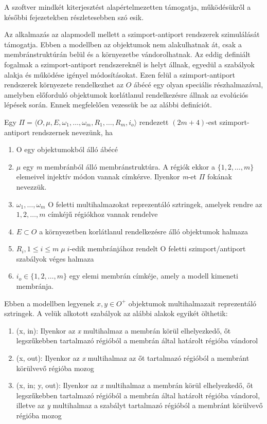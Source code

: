 A szoftver mindkét kiterjesztést alapértelmezetten támogatja, működésükről a későbbi fejezetekben részletesebben szó esik.

Az alkalmazás az alapmodell mellett a szimport-antiport rendszerek szimulálását támogatja. 
Ebben a modellben az objektumok nem alakulhatnak át, csak a membránstruktúrán belül és a környezetbe vándorolhatnak. Az eddig definiált fogalmak a szimport-antiport rendszereknél is helyt állnak, egyedül a szabályok alakja és működése igényel módosításokat. 
Ezen felül a szimport-antiport rendszerek környezete rendelkezhet az $O$ ábécé egy olyan speciális részhalmazával, amelyben előforduló objektumok korlátlanul rendelkezésre állnak az evolúciós lépések során.
Ennek megfelelően vezessük be az alábbi definíciót.

\begin{definition}
Egy $\Pi = \langle O, \mu , E, \omega_1 , \dots , \omega_m, R_1 , \dots , R_m , i_o  \rangle$ rendezett $(2m + 4)$-est szimport-antiport rendszernek nevezünk, ha

\begin{enumerate}
\item O egy objektumokból álló ábécé
\item $\mu$ egy \textit{m} membránból álló membránstruktúra. A régiók ekkor a $\{1,2, \dots, m\}$ elemeivel injektív módon vannak címkézve. Ilyenkor \textit{m}-et $\Pi$ fokának nevezzük.

\item  $\omega_1 , \dots , \omega_m$ O feletti multihalmazokat reprezentáló sztringek, amelyek rendre az $1, 2, \dots, m$ címkéjű régiókhoz vannak rendelve

\item $E \subset O$ a környezetben korlátlanul rendelkezésre álló objektumok halmaza

\item $R_i, 1 \leq i \leq m \; \mu \; i$-edik membránjához rendelt O feletti szimport/antiport szabályok véges halmaza

\item$ i_o \in \{1,2, \dots, m\}$ egy elemi membrán címkéje, amely a modell kimeneti membránja.
\end{enumerate}
\end{definition}

Ebben a modellben legyenek $x, y \in O^+$ objektumok multihalmazait reprezentáló sztringek. A velük alkotott szabályok az alábbi alakok egyikét ölthetik:

\begin{enumerate}
\item (x, in): Ilyenkor az \textit{x} multihalmaz a membrán körül elhelyezkedő, őt legszűkebben tartalmazó régióból a membrán által határolt régióba vándorol
\item (x, out): Ilyenkor az \textit{x} multihalmaz az őt tartalmazó régióból a membránt körülvevő régióba mozog
\item (x, in; y, out): Ilyenkor az \textit{x} multihalmaz a membrán körül elhelyezkedő, őt legszűkebben tartalmazó régióból a membrán által határolt régióba vándorol, illetve az \textit{y} multihalmaz a szabályt tartalmazó régióból a membránt körülvevő régióba mozog
\end{enumerate}

